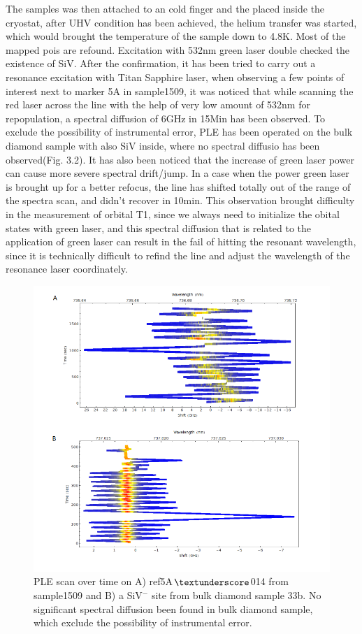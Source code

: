 The samples was then attached to an cold finger and the placed inside the cryostat, after UHV condition has been achieved, the helium transfer was started, which would brought the temperature of the sample down to 4.8K. Most of the mapped pois are refound. Excitation with 532nm green laser double checked the existence of SiV. After the confirmation, it has been tried to carry out a resonance excitation with Titan Sapphire laser, when observing a few points of interest next to marker 5A in sample1509, it was noticed that while scanning the red laser across the line with the help of very low amount of 532nm for repopulation, a spectral diffusion of 6GHz in 15Min has been observed. To exclude the possibility of instrumental error, PLE has been operated on the bulk diamond sample with also SiV inside, where no spectral diffusio has been observed(Fig. 3.2). It has also been noticed that the increase of green laser power can cause more severe spectral drift/jump. In a case when the power green laser is brought up for a better refocus, the line has shifted totally out of the range of the spectra scan, and didn't recover in 10min. This observation brought difficulty in the measurement of orbital T1, since we always need to initialize the obital states with green laser, and this spectral diffusion that is related to the application of green laser can result in the fail of hitting the resonant wavelength, since it is technically difficult to refind the line and adjust the wavelength of the resonance laser coordinately. 

\begin{figure}[h]
\centering
\includegraphics[width=0.7\linewidth]{Figures/pic/PLE}
\caption{PLE scan over time on A) ref5A$\textunderscore$014 from sample1509 and B) a SiV$^{-}$ site from bulk diamond sample 33b. No significant spectral diffusion been found in bulk diamond sample, which exclude the possibility of instrumental error.}
\label{fig:ple}
\end{figure}


